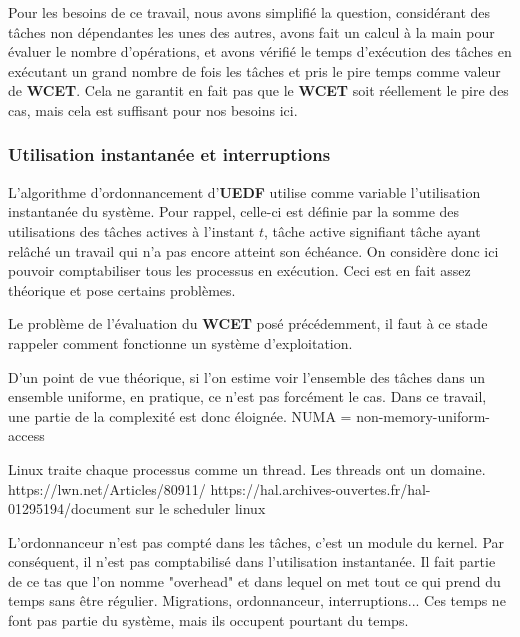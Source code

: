		Pour les besoins de ce travail, nous avons simplifié la question, considérant des tâches 
		non dépendantes les unes des autres, avons fait un calcul à la main pour évaluer le 
		nombre d'opérations, et avons vérifié le temps d'exécution des tâches en exécutant un grand nombre 
		de fois les tâches et pris le pire temps comme valeur de \textbf{WCET}. Cela ne garantit en fait 
		pas que le \textbf{WCET} soit réellement le pire des cas, mais cela est suffisant pour nos besoins ici.
	
	\subsubsection{Utilisation instantanée et interruptions}

	L'algorithme d'ordonnancement d'\textbf{UEDF} utilise comme variable l'utilisation instantanée du système. 
	Pour rappel, celle-ci est définie par la somme des utilisations des tâches actives à l'instant $t$, 
	tâche active signifiant tâche ayant relâché un travail qui n'a pas encore atteint son échéance. 
	On considère donc ici pouvoir comptabiliser tous les processus en exécution. Ceci est 
	en fait assez théorique et pose certains problèmes.
	
	Le problème de l'évaluation du \textbf{WCET} posé précédemment, il faut à ce stade rappeler comment 
	fonctionne un système d'exploitation.
	
	D'un point de vue théorique, si l'on estime voir l'ensemble des tâches dans un ensemble uniforme, 
	en pratique, ce n'est pas forcément le cas. Dans ce travail, une partie de la complexité est 
	donc éloignée. NUMA = non-memory-uniform-access
	
	Linux traite chaque processus comme un thread. Les threads ont un domaine. 
	https://lwn.net/Articles/80911/
	https://hal.archives-ouvertes.fr/hal-01295194/document  sur le scheduler linux
	

	L'ordonnanceur n'est pas compté dans les tâches, c'est un module du kernel. Par conséquent, il n'est pas comptabilisé 
	dans l'utilisation instantanée. Il fait partie de ce tas que l'on nomme "overhead" et dans lequel 
	on met tout ce qui prend du temps sans être régulier. 
	Migrations, ordonnanceur, interruptions... Ces temps ne font pas partie du système, mais ils occupent
	pourtant du temps.
	
